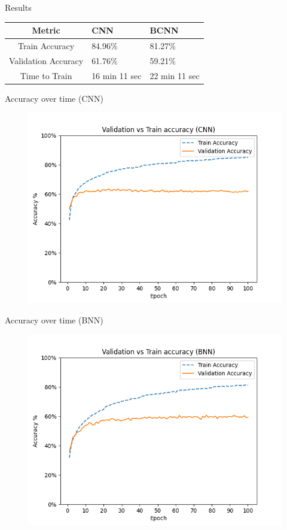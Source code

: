 \documentclass{beamer}
\begin{document}
\begin{frame}{Results}
	\centering
	\begin{tabular}{|c||p{3cm}|p{3cm}|} %
		\hline
		\textbf{Metric} & \textbf{CNN} & \textbf{BCNN} \\ [0.5ex] 
		\hline\hline
		Train Accuracy & 84.96\% & 81.27\%\\
		\hline
		Validation Accuracy & 61.76\%  & 59.21\%  \\
		\hline
		Time to Train & 16 min 11 sec  & 22 min 11 sec  \\
		\hline
	\end{tabular}
\end{frame}

\begin{frame}{Accuracy over time (CNN)}
	\begin{figure}
		\includegraphics[width=.75\textwidth]{../Images/CNN_val_acc_over_time}
	\end{figure}
\end{frame}

\begin{frame}{Accuracy over time (BNN)}
	\begin{figure}
		\includegraphics[width=.75\textwidth]{../Images/BNN_val_acc_over_time}
	\end{figure}
\end{frame}
\end{document}
